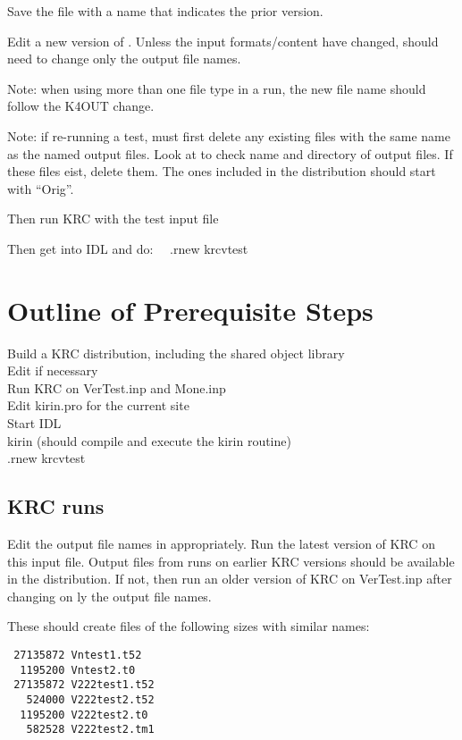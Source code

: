 \documentclass{article}  %
\begin{document}
Save the   file with a name that indicates the prior version.

Edit a new version of .  Unless the input formats/content have changed, should need to change only the output file names.

Note: when using more than one file type in a run, the new file name should follow the K4OUT change.

Note: if re-running a test, must first delete any existing files with the same name as the  named output files. Look at  to check name and directory of output files. If these files eist, delete them. The ones included in the distribution should start with ``Orig''. 

Then run KRC with the test input file

Then get into IDL and do: \ \  .rnew krcvtest


\section{Outline of Prerequisite Steps} %
Build a KRC distribution, including the shared object library
\\ Edit  if necessary
\\ Run KRC on VerTest.inp and Mone.inp
\\ Edit kirin.pro for the current site
\\ Start IDL
\\ kirin  (should compile and execute the kirin routine)
\\ .rnew krcvtest


\subsection{KRC runs}
Edit the output file names in    appropriately. Run the latest version of KRC on this input file.
\qi Output files from runs on earlier KRC versions should be available in the distribution.  If not, then run an older version of KRC  on VerTest.inp after changing on ly the output file names.

These should create files of the following sizes with similar names:
\vspace{-3.mm} 
\begin{verbatim}
 27135872 Vntest1.t52
  1195200 Vntest2.t0
 27135872 V222test1.t52
   524000 V222test2.t52
  1195200 V222test2.t0
   582528 V222test2.tm1
\end{verbatim}
\end{document}
